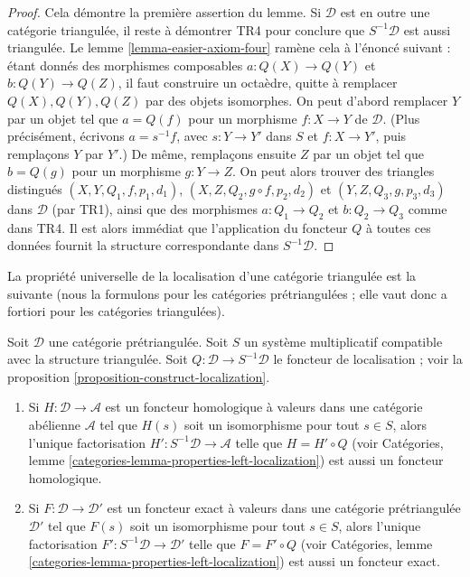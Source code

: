 \begin{proof}
\medskip\noindent
Cela démontre la première assertion du lemme. Si $\mathcal{D}$ est en
outre une catégorie triangulée, il reste à démontrer TR4 pour conclure que
$S^{-1}\mathcal{D}$ est aussi triangulée. Le lemme
\ref{lemma-easier-axiom-four} ramène cela à l'énoncé suivant : étant donnés des
morphismes composables $a : Q(X) \to Q(Y)$ et $b : Q(Y) \to Q(Z)$, il faut
construire un octaèdre, quitte à remplacer $Q(X), Q(Y), Q(Z)$ par des objets
isomorphes. On peut d'abord remplacer $Y$ par un objet tel que
$a = Q(f)$ pour un morphisme $f : X \to Y$ de $\mathcal{D}$. (Plus précisément,
écrivons $a = s^{-1}f$, avec $s : Y \to Y'$ dans $S$ et $f : X \to Y'$, puis
remplaçons $Y$ par $Y'$.) De même, remplaçons ensuite $Z$ par un objet tel que
$b = Q(g)$ pour un morphisme $g : Y \to Z$. On peut alors trouver des triangles
distingués
$(X, Y, Q_1, f, p_1, d_1)$,
$(X, Z, Q_2, g \circ f, p_2, d_2)$ et
$(Y, Z, Q_3, g, p_3, d_3)$ dans $\mathcal{D}$ (par TR1), ainsi que des morphismes
$a : Q_1 \to Q_2$ et $b : Q_2 \to Q_3$ comme dans TR4.
Il est alors immédiat que l'application du foncteur $Q$ à toutes ces données
fournit la structure correspondante dans $S^{-1}\mathcal{D}$.
\end{proof}

\noindent
La propriété universelle de la localisation d'une catégorie triangulée est la
suivante (nous la formulons pour les catégories prétriangulées ; elle vaut donc
a fortiori pour les catégories triangulées).

\begin{lemma}
\label{lemma-universal-property-localization}
Soit $\mathcal{D}$ une catégorie prétriangulée. Soit $S$ un système
multiplicatif compatible avec la structure triangulée. Soit
$Q : \mathcal{D} \to S^{-1}\mathcal{D}$ le foncteur de localisation ; voir la
proposition \ref{proposition-construct-localization}.
\begin{enumerate}
\item Si $H : \mathcal{D} \to \mathcal{A}$ est un foncteur homologique à
valeurs dans une catégorie abélienne $\mathcal{A}$ tel que $H(s)$ soit un
isomorphisme pour tout $s \in S$, alors l'unique factorisation
$H' : S^{-1}\mathcal{D} \to \mathcal{A}$ telle que $H = H' \circ Q$ (voir
Catégories, lemme \ref{categories-lemma-properties-left-localization}) est aussi
un foncteur homologique.
\item Si $F : \mathcal{D} \to \mathcal{D}'$ est un foncteur exact à valeurs
dans une catégorie prétriangulée $\mathcal{D}'$ tel que $F(s)$ soit un
isomorphisme pour tout $s \in S$, alors l'unique factorisation
$F' : S^{-1}\mathcal{D} \to \mathcal{D}'$ telle que $F = F' \circ Q$ (voir
Catégories, lemme \ref{categories-lemma-properties-left-localization}) est aussi
un foncteur exact.
\end{enumerate}
\end{lemma}

